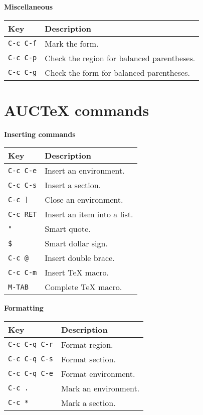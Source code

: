 \documentclass{article}
\begin{document}
\smallskip

\noindent
\textbf{Miscellaneous}

\smallskip

\noindent
\begin{tabular}{p{\firstcol}p{\secondcol}}
\hline
\textbf{Key} & \textbf{Description}\\
\hline
\texttt{C-c C-f} & Mark the form.\\
\texttt{C-c C-p} & Check the region for balanced parentheses.\\
\texttt{C-c C-g} & Check the form for balanced parentheses.
\end{tabular}

\section{AUC\TeX{} commands}

\smallskip

\noindent
\textbf{Inserting commands}

\smallskip

\noindent
\begin{tabular}{p{\firstcol}p{\secondcol}}
\hline
\textbf{Key} & \textbf{Description}\\
\hline
\texttt{C-c C-e}
& Insert an environment.\\
\texttt{C-c C-s}
& Insert a section.\\
\texttt{C-c ]}
& Close an environment.\\
\texttt{C-c \texttt{RET}}
& Insert an item into a list.\\
\texttt{"}
& Smart quote.\\
\texttt{\$}
& Smart dollar sign.\\
\texttt{C-c @}
& Insert double brace.\\
\texttt{C-c C-m}
& Insert \TeX{} macro.\\
\texttt{M-TAB}
& Complete \TeX{} macro.\\
\end{tabular}

\smallskip

\noindent
\textbf{Formatting}

\smallskip

\noindent
\begin{tabular}{p{\firstcol}p{\secondcol}}
\hline
\textbf{Key} & \textbf{Description}\\
\hline
\texttt{C-c C-q C-r}
& Format region.\\
\texttt{C-c C-q C-s}
& Format section.\\
\texttt{C-c C-q C-e}
& Format environment.\\
\texttt{C-c .}
& Mark an environment.\\
\texttt{C-c *}
& Mark a section.
\end{tabular}
\end{document}
